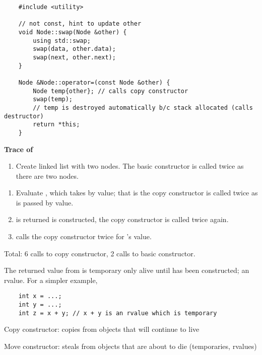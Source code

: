 \begin{lstlisting}
    #include <utility>

    // not const, hint to update other
    void Node::swap(Node &other) {
        using std::swap;
        swap(data, other.data);
        swap(next, other.next);
    }

    Node &Node::operator=(const Node &other) {
        Node temp{other}; // calls copy constructor
        swap(temp);
        // temp is destroyed automatically b/c stack allocated (calls destructor)
        return *this;
    }
\end{lstlisting}



\textbf{Trace of} 

\begin{enumerate}[(1)]
    \item Create linked list with two nodes. The basic constructor is called twice
    as there are two nodes.
\end{enumerate}

\begin{enumerate}[(1)]
    \item Evaluate , which takes  by value; that is
    the copy constructor is called twice as  is passed by value.
    \item {} is returned  is constructed, the copy constructor
    is called twice again.
    \item {} calls the copy constructor twice for 's value.
\end{enumerate}

Total: 6 calls to copy constructor, 2 calls to basic constructor.

The returned value from  is temporary only alive until 
has been constructed; an rvalue. For a simpler example,
\begin{lstlisting}
    int x = ...;
    int y = ...;
    int z = x + y; // x + y is an rvalue which is temporary
\end{lstlisting}

Copy constructor: copies from objects that will continue to live

Move constructor: steals from objects that are about to die (temporaries, rvalues)

